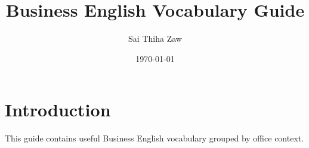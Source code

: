 \documentclass[12pt]{article}
\title{Business English Vocabulary Guide}
\author{Sai Thiha Zaw}
\date{\today}
\begin{document}
	
	\maketitle
	\tableofcontents
	\newpage
	
	\section*{Introduction}
	This guide contains useful Business English vocabulary grouped by office context.
	
	\newpage
	
	
\end{document}
